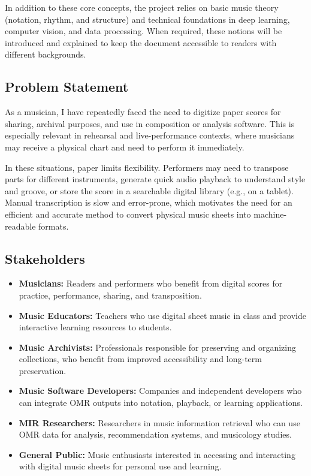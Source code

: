 \documentclass[11pt, a4paper]{article}
\begin{document}
In addition to these core concepts, the project relies on basic music theory (notation, rhythm, and structure) and technical foundations in deep learning, computer vision, and data processing. When required, these notions will be introduced and explained to keep the document accessible to readers with different backgrounds.


\subsection{Problem Statement}
As a musician, I have repeatedly faced the need to digitize paper scores for sharing, archival purposes, and use in composition or analysis software. This is especially relevant in rehearsal and live-performance contexts, where musicians may receive a physical chart and need to perform it immediately.

In these situations, paper limits flexibility. Performers may need to transpose parts for different instruments, generate quick audio playback to understand style and groove, or store the score in a searchable digital library (e.g., on a tablet). Manual transcription is slow and error-prone, which motivates the need for an efficient and accurate method to convert physical music sheets into machine-readable formats.

\subsection{Stakeholders}
\begin{itemize}
    \item \textbf{Musicians:} Readers and performers who benefit from digital scores for practice, performance, sharing, and transposition.
    \item \textbf{Music Educators:} Teachers who use digital sheet music in class and provide interactive learning resources to students.
    \item \textbf{Music Archivists:} Professionals responsible for preserving and organizing collections, who benefit from improved accessibility and long-term preservation.
    \item \textbf{Music Software Developers:} Companies and independent developers who can integrate OMR outputs into notation, playback, or learning applications.
    \item \textbf{MIR Researchers:} Researchers in music information retrieval who can use OMR data for analysis, recommendation systems, and musicology studies.
    \item \textbf{General Public:} Music enthusiasts interested in accessing and interacting with digital music sheets for personal use and learning.
\end{itemize}
\end{document}

